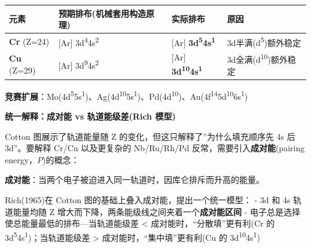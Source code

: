 {\def\LTcaptype{none} %
\begin{longtable}[]{@{}
  >{\raggedright\arraybackslash}p{}
  >{\raggedright\arraybackslash}p{}
  >{\raggedright\arraybackslash}p{}
  >{\raggedright\arraybackslash}p{}@{}}
\toprule\noalign{}
\begin{minipage}[b]{\linewidth}\raggedright
元素
\end{minipage} & \begin{minipage}[b]{\linewidth}\raggedright
预期排布(机械套用构造原理)
\end{minipage} & \begin{minipage}[b]{\linewidth}\raggedright
实际排布
\end{minipage} & \begin{minipage}[b]{\linewidth}\raggedright
原因
\end{minipage} \\
\midrule\noalign{}
\endhead
\bottomrule\noalign{}
\endlastfoot
\textbf{Cr} (Z=24) & {[}Ar{]} 3d\textsuperscript{4}4s\textsuperscript{2} & {[}Ar{]} \textbf{3d\textsuperscript{5}4s\textsuperscript{1}} & 3d半满(d\textsuperscript{5})额外稳定 \\
\textbf{Cu} (Z=29) & {[}Ar{]} 3d\textsuperscript{9}4s\textsuperscript{2} & {[}Ar{]} \textbf{3d\textsuperscript{10}4s\textsuperscript{1}} & 3d全满(d\textsuperscript{10})额外稳定 \\
\end{longtable}
}

\textbf{竞赛扩展}：Mo(4d\textsuperscript{5}5s\textsuperscript{1})、Ag(4d\textsuperscript{10}5s\textsuperscript{1})、Pd(4d\textsuperscript{10})、Au(4f\textsuperscript{14}5d\textsuperscript{10}6s\textsuperscript{1})

\textbf{统一解释：成对能 vs 轨道能级差(Rich 模型)}

Cotton 图展示了轨道能量随 Z 的变化，但这只解释了''为什么填充顺序先 4s 后 3d''。要解释 Cr/Cu 以及更复杂的 Nb/Ru/Rh/Pd 反常，需要引入\textbf{成对能}(pairing energy，\(P\))的概念：

\textbf{成对能}：当两个电子被迫进入同一轨道时，因库仑排斥而升高的能量。

Rich(1965)在 Cotton 图的基础上叠入成对能，提出一个统一模型：
- 3d 和 4s 轨道能量均随 Z 增大而下降，两条能级线之间夹着一个\textbf{成对能区间}
- 电子总是选择使总能量最低的排布---当轨道能级差 \textless{} 成对能时，``分散填''更有利(Cr 的 3d\textsuperscript{5}4s\textsuperscript{1})；当轨道能级差 \textgreater{} 成对能时，``集中填''更有利(Cu 的 3d\textsuperscript{10}4s\textsuperscript{1})


